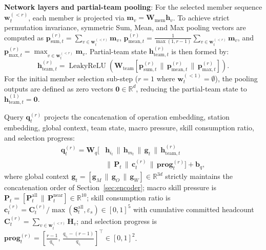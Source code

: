 \documentclass[journal,10pt]{IEEEtran}
\begin{document}
\textbf{Network layers and partial-team pooling}:
For the selected member sequence $\mathbf w_t^{(<r)}$, each member is projected via $\mathbf m_v = \mathbf W_{\mathrm{mem}}\mathbf h_v$. To achieve strict permutation invariance, symmetric Sum, Mean, and Max pooling vectors are computed as $\mathbf p_{\mathrm{sum},t}^{(r)} = \sum_{v\in \mathbf w_t^{(<r)}} \mathbf m_v$, $\mathbf p_{\mathrm{mean},t}^{(r)} = \frac{1}{\max(1, r-1)}\sum_{v\in \mathbf w_t^{(<r)}} \mathbf m_v$, and $\mathbf p_{\mathrm{max},t}^{(r)} = \max_{v\in \mathbf w_t^{(<r)}} \mathbf m_v$. Partial-team state $\mathbf h_{\mathrm{team},t}^{(r)}$ is then formed by:
\begin{equation}
\mathbf h_{\mathrm{team},t}^{(r)} = \operatorname{LeakyReLU}\left( \mathbf W_{\mathrm{team}} \left[ \mathbf p_{\mathrm{sum},t}^{(r)} \,\|\, \mathbf p_{\mathrm{mean},t}^{(r)} \,\|\, \mathbf p_{\mathrm{max},t}^{(r)} \right] \right).
\end{equation}
For the initial member selection sub-step ($r=1$ where $\mathbf w_t^{(<1)}=\emptyset$), the pooling outputs are defined as zero vectors $\mathbf 0\in\mathbb R^d$, reducing the partial-team state to $\mathbf h_{\mathrm{team},t}^{(1)}=\mathbf 0$.

Query $\mathbf q_t^{(r)}$ projects the concatenation of operation embedding, station embedding, global context, team state, macro pressure, skill consumption ratio, and selection progress:
\begin{equation}
\begin{aligned}
\mathbf q_t^{(r)} = \mathbf W_q\Big[ &\mathbf h_{i_t}\,\|\,\mathbf h_{m_t}\,\|\,\mathbf g_t\,\|\,\mathbf h_{\mathrm{team},t}^{(r)} \\
&\|\,\mathbf P_t\,\|\,\mathbf c_t^{(r)}\,\|\,\mathbf{prog}_t^{(r)}\Big]+\mathbf b_q,
\end{aligned}
\end{equation}
where global context $\mathbf g_t = [\mathbf g_M \,\|\, \mathbf g_O \,\|\, \mathbf g_W] \in \mathbb R^{3d}$ strictly maintains the concatenation order of Section~\ref{sec:encoder}; macro skill pressure is $\mathbf P_t = [\mathbf P_t^{\mathrm{all}} \,\|\, \mathbf P_t^{\mathrm{near}}] \in \mathbb R^{10}$; skill consumption ratio is $\mathbf c_t^{(r)} = \mathbf C_t^{(r)} / \max(\mathbf S_t^{\mathrm{all}}, \varepsilon_s) \in [0,1]^5$ with cumulative committed headcount $\mathbf C_t^{(r)} = \sum_{v\in\mathbf w_t^{(<r)}} \mathbf H_v$; and selection progress is $\mathbf{prog}_t^{(r)} = \left[\frac{r-1}{q_{i_t}},\, \frac{q_{i_t}-(r-1)}{q_{i_t}}\right]^\top \in [0,1]^2$.
\end{document}
